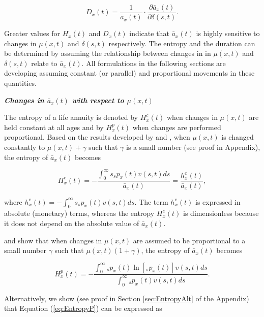 \documentclass[12pt]{article}
\begin{document}
\begin{equation}\label{eq:DurationGeneral}
{D}_{x}(t) = \frac{1}{\bar{a}_x(t)}\cdot  \frac{\partial \bar{a}_x(t) }{\partial \delta(s,t)}.
\end{equation}

Greater values for ${H}_{x}(t)$ and ${D}_{x}(t)$ indicate that $\bar{a}_x(t)$ is highly sensitive to changes in $\mu(x,t)$ and $\delta(s,t)$ respectively. The entropy and the duration can be determined by assuming the relationship between changes in in $\mu(x,t)$ and $\delta(s,t)$ relate to $\bar{a}_x(t)$. All formulations in the following sections are developing assuming constant (or parallel) and proportional movements in these quantities.

\textit{\textbf{{Changes in $\bar{a}_x(t)$ with respect to $\mu(x,t)$}}}

The entropy of a life annuity is denoted by ${H}^{c}_{x}(t)$ when changes in $\mu(x,t)$ are held constant at all ages and by ${H}^{p}_{x}(t)$ when changes are performed proportional. Based on the results developed by \citet{Tsai2013a} and \citet{Lin2020}, when $\mu(x,t)$ is changed constantly to $\mu(x,t)+\gamma$ such that $\gamma$ is a small number (see proof in Appendix), the entropy of $\bar{a}_x(t)$ becomes

\begin{equation}\label{eq:EntropyC}
{H}^{c}_{x}(t) = -\frac{\int_{0}^\infty s {}_sp_x(t) {v}(s,t) ds}{\bar{a}_x(t)}=\frac{{h}^{c}_{x}(t)}{\bar{a}_x(t)},
\end{equation}

where ${h}^{c}_{x}(t)=-\int_{0}^\infty s {}_sp_x(t) {v}(s,t) ds$. The term ${h}^{c}_{x}(t)$ is expressed in absolute (monetary) terms, whereas the entropy ${H}^{c}_{x}(t)$ is dimensionless because it does not depend on the absolute value of $\bar{a}_x(t)$.


\citet{Haberman2011} and \citet{Tsai2013a} show that when changes in $\mu(x,t)$ are assumed to be proportional to a small number $\gamma$ such that $\mu(x,t)(1+\gamma)$, the entropy of $\bar{a}_x(t)$ becomes

\begin{equation} \label{eq:EntropyP}
{H}^{p}_{x}(t) = -\frac{ \int_{0}^{\infty}{}_sp_x(t)\ln[{}_sp_x(t)] {v}(s,t) ds}{\int_0^\infty {}_sp_x(t) {v}(s,t) ds}.
\end{equation}


Alternatively, we show (see proof in Section \ref{sec:EntropyAlt} of the Appendix) that Equation (\ref{eq:EntropyP}) can be expressed as
\end{document}
